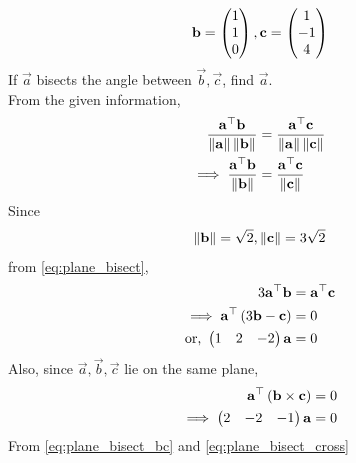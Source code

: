 \documentclass[journal,12pt,twocolumn]{IEEEtran}
\renewcommand\thesection{\arabic{section}}
\begin{document}
\begin{enumerate}[label=\thesection.\arabic*.,ref=\thesection.\theenumi]
\begin{align}
	\mathbf{b} = 	\begin{pmatrix}1\\  1 \\ 0\end{pmatrix}, 
	\mathbf{c} = 	\begin{pmatrix}1\\  -1 \\ 4\end{pmatrix}
\end{align}
		If $\vec{a}$ bisects the angle between $\vec{b}, \vec{c}$, find $\vec{a}$.
		\\
		\solution From the given information, 
\begin{align}
	\frac{\mathbf{a}^{\top}\mathbf{b}}{\left\lVert\mathbf{a}\right\rVert\left\lVert\mathbf{b}\right\rVert} &=	\frac{\mathbf{a}^{\top}\mathbf{c}}{\left\lVert\mathbf{a}\right\rVert\left\lVert\mathbf{c}\right\rVert}
	\\
\implies	\frac{\mathbf{a}^{\top}\mathbf{b}}{\left\lVert\mathbf{b}\right\rVert} &=	\frac{\mathbf{a}^{\top}\mathbf{c}}{\left\lVert\mathbf{c}\right\rVert}
	\label{eq:plane_bisect}
\end{align}
Since 
\begin{align}
	\left\lVert\mathbf{b}\right\rVert = \sqrt{2},
		\left\lVert\mathbf{c}\right\rVert =3\sqrt{2}
\end{align}
from 	\eqref{eq:plane_bisect},
\begin{align}
3	{\mathbf{a}^{\top}\mathbf{b}} &=	{\mathbf{a}^{\top}\mathbf{c}}
\\
	\implies \mathbf{a}^{\top}\left(3\mathbf{b}-\mathbf{c}\right) &= 0
\\
	\text{or, }\begin{pmatrix}1 & 2 & -2\end{pmatrix}\mathbf{a} &= 0
	\label{eq:plane_bisect_bc}
\end{align}
Also, since $\vec{a}, \vec{b}, \vec{c}$ lie on the same plane, 
\begin{align}
	\mathbf{a}^{\top}\left(\mathbf{b}\times \mathbf{c}\right) &= 0
	\\
	\implies \begin{pmatrix}2 & -2 & -1\end{pmatrix}\mathbf{a} &=0
	\label{eq:plane_bisect_cross}
\end{align}
From 
	\eqref{eq:plane_bisect_bc} and 
	\eqref{eq:plane_bisect_cross}


\end{enumerate}
\end{document}
